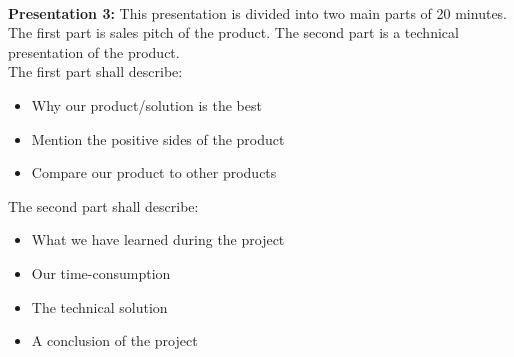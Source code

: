 \\
\textbf{Presentation 3:}
This presentation is divided into two main parts of 20 minutes. The first part is sales pitch of the product. The second part is a technical presentation of the product. \\
The first part shall describe:
\begin{itemize}
  \item Why our product/solution is the best 
  \item Mention the positive sides of the product
  \item Compare our product to other products 
\end{itemize}
The second part shall describe: 
\begin{itemize}
  \item What we have learned during the project 
  \item Our time-consumption 
  \item The technical solution
  \item A conclusion of the project 
\end{itemize} 

